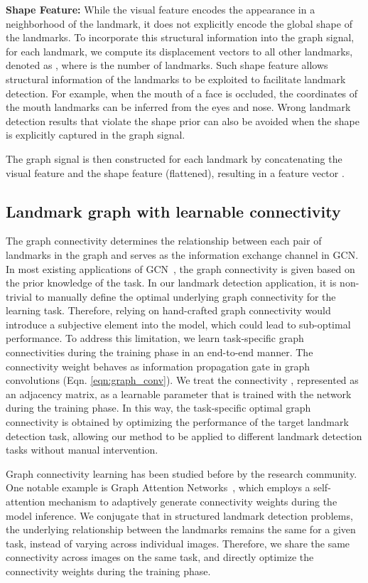\documentclass[runningheads]{llncs}
\begin{document}
\textbf{Shape Feature:} While the visual feature encodes the appearance in a neighborhood of the landmark, it does not explicitly encode the global shape of the landmarks. To incorporate this structural information into the graph signal, for each landmark, we compute its displacement vectors to all other landmarks, denoted as , where  is the number of landmarks. Such shape feature allows structural information of the landmarks to be exploited to facilitate landmark detection. For example, when the mouth of a face is occluded, the coordinates of the mouth landmarks can be inferred from the eyes and nose. Wrong landmark detection results that violate the shape prior can also be avoided when the shape is explicitly captured in the graph signal. 

The graph signal  is then constructed for each landmark by concatenating the visual feature  and the shape feature  (flattened), resulting in a feature vector .

\subsection{Landmark graph with learnable connectivity}
\label{subsec:graphadj}

The graph connectivity determines the relationship between each pair of landmarks in the graph and serves as the information exchange channel in GCN. In most existing applications of GCN~\cite{qi2019attentive,ling2019fast,zhao2019semantic,velivckovic2017graph,wu2019session}, the graph connectivity is given based on the prior knowledge of the task. In our landmark detection application, it is non-trivial to manually define the optimal underlying graph connectivity for the learning task. 
Therefore, relying on hand-crafted graph connectivity would introduce a subjective element into the model, which could lead to sub-optimal performance. To address this limitation, we learn task-specific graph connectivities during the training phase in an end-to-end manner. The connectivity weight  behaves as information propagation gate in graph convolutions (Eqn. \ref{eqn:graph_conv}). We treat the connectivity , represented as an adjacency matrix, as a learnable parameter that is trained with the network during the training phase. In this way, the task-specific optimal graph connectivity is obtained by optimizing the performance of the target landmark detection task, allowing our method to be applied to different landmark detection tasks without manual intervention.

Graph connectivity learning has been studied before by the research community. One notable example is Graph Attention Networks~\cite{velivckovic2017graph}, which employs a self-attention mechanism to adaptively generate connectivity weights during the model inference. We conjugate that in structured landmark detection problems, the underlying relationship between the landmarks remains the same for a given task, instead of varying across individual images. Therefore, we share the same connectivity across images on the same task, and directly optimize the connectivity weights during the training phase.
\end{document}
